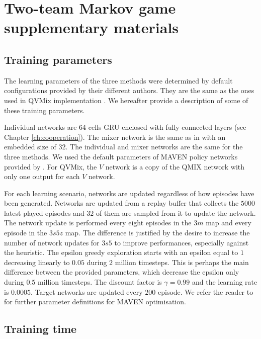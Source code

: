 \chapter{Two-team Markov game supplementary materials} \label{ch:ch7_appendix}
\section{Training parameters}
\label{app:train_param}
The learning parameters of the three methods were determined by default configurations provided by their different authors.
They are the same as the ones used in QVMix implementation \citep{leroy2020qvmix}.
We hereafter provide a description of some of these training parameters.

Individual networks are 64 cells GRU enclosed with fully connected layers (see Chapter \ref{ch:cooperation}).
The mixer network is the same as in \citep{Rashid2018} with an embedded size of 32.
The individual and mixer networks are the same for the three methods.
We used the default parameters of MAVEN policy networks provided by \citep{Mahajan2019MAVEN:Exploration}.
For QVMix, the $V$ network is a copy of the QMIX network with only one output for each $V$ network.

For each learning scenario, networks are updated regardless of how episodes have been generated.
Networks are updated from a replay buffer that collects the $5000$ latest played episodes and $32$ of them are sampled from it to update the network.
The network update is performed every eight episodes in the $3m$ map and every episode in the $3s5z$ map.
The difference is justified by the desire to increase the number of network updates for $3s5$ to improve performances, especially against the heuristic.
The epsilon greedy exploration starts with an epsilon equal to $1$ decreasing linearly to $0.05$ during $2$ million timesteps.
This is perhaps the main difference between the provided parameters, which decrease the epsilon only during $0.5$ million timesteps.
The discount factor is $\gamma = 0.99$ and the learning rate is $0.0005$.
Target networks are updated every $200$ episode.
We refer the reader to \citep{Mahajan2019MAVEN:Exploration} for further parameter definitions for MAVEN optimisation.

\section{Training time}
\label{app:train_time}

